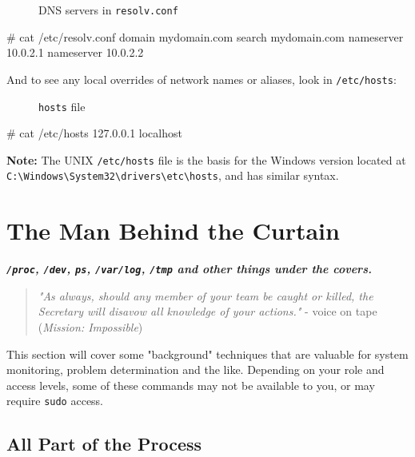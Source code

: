 \documentclass[10pt,american,]{book}
\newenvironment{Shaded}{\begin{snugshade}}{\end{snugshade}}
\newcommand{\KeywordTok}[1]{\textcolor[rgb]{0.13,0.29,0.53}{\textbf{{#1}}}}
\newcommand{\CommentTok}[1]{\textcolor[rgb]{0.56,0.35,0.01}{\textit{{#1}}}}
\newcommand{\NormalTok}[1]{{#1}}
\numberwithin{figure}{chapter}
\DeclareRobustCommand{\drcap}[1]{\begin{figure}[H]\caption{#1}\end{figure}}
\renewcommand{\KeywordTok}[1]{{#1}}
\renewcommand{\CommentTok}[1]{{#1}}
\renewcommand{\NormalTok}[1]{{#1}}
\begin{document}
\drcap{DNS servers in \texttt{resolv.conf}}

\begin{Shaded}
\begin{Highlighting}[]
\CommentTok{# cat /etc/resolv.conf}
\KeywordTok{domain} \NormalTok{mydomain.com}
\KeywordTok{search} \NormalTok{mydomain.com}
\KeywordTok{nameserver} \NormalTok{10.0.2.1}
\KeywordTok{nameserver} \NormalTok{10.0.2.2}
\end{Highlighting}
\end{Shaded}

And to see any local overrides of network names or aliases, look in
\texttt{/etc/hosts}:

\drcap{\texttt{hosts} file}

\begin{Shaded}
\begin{Highlighting}[]
\CommentTok{# cat /etc/hosts}
\KeywordTok{127.0.0.1}       \NormalTok{localhost}
\end{Highlighting}
\end{Shaded}

\textbf{Note:} The UNIX \texttt{/etc/hosts} file is the basis for the
Windows version located at
\texttt{C:\textbackslash{}Windows\textbackslash{}System32\textbackslash{}drivers\textbackslash{}etc\textbackslash{}hosts},
and has similar syntax.

\hypertarget{the-man-behind-the-curtain}{\chapter{The Man Behind the
Curtain}\label{the-man-behind-the-curtain}}

\textbf{\emph{\texttt{/proc}, \texttt{/dev}, \texttt{ps},
\texttt{/var/log}, \texttt{/tmp} and other things under the covers.}}

\begin{quote}
\emph{"As always, should any member of your team be caught or killed,
the Secretary will disavow all knowledge of your actions."} - voice on
tape (\emph{Mission: Impossible})
\end{quote}

This section will cover some "background" techniques that are valuable
for system monitoring, problem determination and the like. Depending on
your role and access levels, some of these commands may not be available
to you, or may require \texttt{sudo} access.

\section*{All Part of the Process}\label{all-part-of-the-process}
\end{document}
